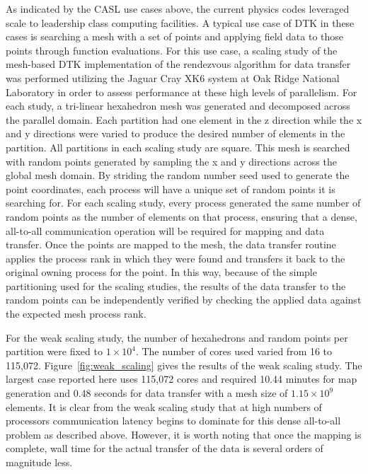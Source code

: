 \documentclass{mc2013}
\begin{document}
\label{sec:scaling_study}

As indicated by the CASL use cases above, the current physics codes
leveraged scale to leadership class computing facilities. A typical
use case of DTK in these cases is searching a mesh with a set of
points and applying field data to those points through function
evaluations. For this use case, a scaling study of the mesh-based DTK
implementation of the rendezvous algorithm for data transfer was
performed utilizing the Jaguar Cray XK6 system at Oak Ridge National
Laboratory in order to assess performance at these high levels of
parallelism. For each study, a tri-linear hexahedron mesh was
generated and decomposed across the parallel domain. Each partition
had one element in the z direction while the x and y directions were
varied to produce the desired number of elements in the partition. All
partitions in each scaling study are square. This mesh is searched
with random points generated by sampling the x and y directions across
the global mesh domain.  By striding the random number seed used to
generate the point coordinates, each process will have a unique set of
random points it is searching for. For each scaling study, every
process generated the same number of random points as the number of
elements on that process, ensuring that a dense, all-to-all
communication operation will be required for mapping and data
transfer. Once the points are mapped to the mesh, the data transfer
routine applies the process rank in which they were found and
transfers it back to the original owning process for the point. In
this way, because of the simple partitioning used for the scaling
studies, the results of the data transfer to the random points can be
independently verified by checking the applied data against the
expected mesh process rank.

\label{subsec:weak_scaling}
For the weak scaling study, the number of hexahedrons and random
points per partition were fixed to $1 \times 10^4$. The number of
cores used varied from 16 to 115,072. Figure~\ref{fig:weak_scaling}
gives the results of the weak scaling study. The largest case reported
here uses 115,072 cores and required 10.44 minutes for map generation
and 0.48 seconds for data transfer with a mesh size of $1.15 \times
10^9$ elements. It is clear from the weak scaling study that at high
numbers of processors communication latency begins to dominate for
this dense all-to-all problem as described above. However, it is worth
noting that once the mapping is complete, wall time for the actual
transfer of the data is several orders of magnitude less.
\end{document}
